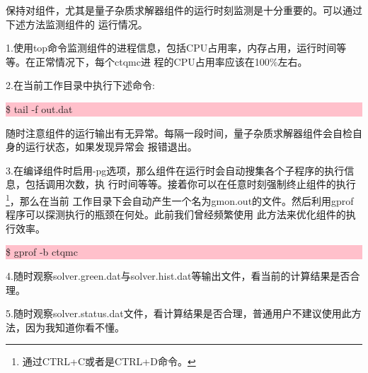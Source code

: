 保持对{\iqist}组件，尤其是量子杂质求解器组件的运行时刻监测是十分重要的。可以通过下述方法监测{\iqist}组件的
运行情况。

1.使用top命令监测{\iqist}组件的进程信息，包括CPU占用率，内存占用，运行时间等等。在正常情况下，每个ctqmc进
程的CPU占用率应该在100\%左右。

2.在当前工作目录中执行下述命令:

\noindent\colorbox{pink}{\parbox[r]{\linewidth}{\quad \$ tail -f out.dat}}

随时注意{\iqist}组件的运行输出有无异常。每隔一段时间，量子杂质求解器组件会自检自身的运行状态，如果发现异常会
报错退出。

3.在编译{\iqist}组件时启用-pg选项，那么{\iqist}组件在运行时会自动搜集各个子程序的执行信息，包括调用次数，执
行时间等等。接着你可以在任意时刻强制终止{\iqist}组件的执行\footnote{通过CTRL+C或者是CTRL+D命令。}，那么在当前
工作目录下会自动产生一个名为gmon.out的文件。然后利用gprof程序可以探测执行的瓶颈在何处。此前我们曾经频繁使用
此方法来优化{\iqist}组件的执行效率。

\noindent\colorbox{pink}{\parbox[r]{\linewidth}{\quad \$ gprof -b ctqmc}}

4.随时观察solver.green.dat与solver.hist.dat等输出文件，看当前的计算结果是否合理。

5.随时观察solver.status.dat文件，看计算结果是否合理，普通用户不建议使用此方法，因为我知道你看不懂。
